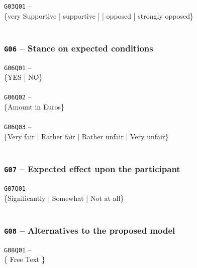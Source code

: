 \begin{displayquote}
    \texttt{G03Q01} -- \\
    \{very Supportive | supportive | | opposed | strongly opposed\}\\\\
\end{displayquote}

\subsubsection{\texttt{G06} -- Stance on expected conditions}
\begin{displayquote}
    \texttt{G06Q01} -- \\
    \{YES | NO\}\\\\
    \texttt{G06Q02} -- \\
    \{Amount in Euros\}\\\\
    \texttt{G06Q03} -- \\
    \{Very fair | Rather fair | Rather unfair | Very unfair\}\\\\
\end{displayquote}

\subsubsection{\texttt{G07} -- Expected effect upon the participant}
\begin{displayquote}
    \texttt{G07Q01} -- \\
    \{Significantly | Somewhat | Not at all\}\\\\
\end{displayquote}

\subsubsection{\texttt{G08} -- Alternatives to the proposed model}
\begin{displayquote}
    \texttt{G08Q01} -- \\
    \{ Free Text \}
\end{displayquote}

